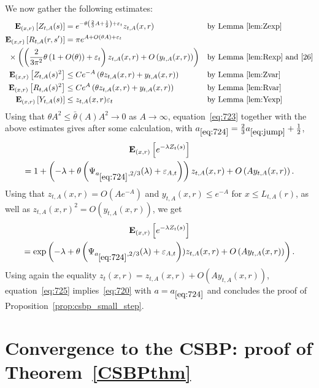 \documentclass[AHL,Unicode,longabstracts,published]{cedram}
\newcommand*\eps{\varepsilon}
\newcommand*\E{\mathbf{E}}
\newcommand{\1} {\mathds{1}}
\renewcommand*\to{\rightarrow}
\begin{document}
We now gather the following estimates:
\begin{align*}
\E_{(x,r)}\left[Z_{t,A}(s)\right] &= e^{-\theta\left(\frac{2}{3}A+\frac{1}{2}\right)+\eps_t} z_{t,A}(x,r) && \text{by Lemma~\ref{lem:Zexp}}\\
\E_{(x,r)}\left[R_{t,A}(r,s')\right] &= \pi e^{A+O(\theta A)+\eps_t}\\
&\hspace{-1in}\times \left(\left(\frac{2}{3\pi^2}\theta\left(1+ O(\theta)\right) + \eps_t \right) z_{t,A}(x,r) + O\left(y_{t,A}(x,r)\right)\right) && \text{by Lemma~\ref{lem:Rexp} and~\eqref{26}}\\
\E_{(x,r)}\left[Z_{t,A}(s)^2\right] &\le Ce^{-A}\left(\theta z_{t,A}(x,r)+y_{t,A}(x,r)\right) && \text{by Lemma~\ref{lem:Zvar}}\\
\E_{(x,r)}\left[R_{t,A}(s)^2\right] &\le Ce^A\left(\theta z_{t,A}(x,r)+y_{t,A}(x,r)\right) && \text{by Lemma~\ref{lem:Rvar}}\\
\E_{(x,r)}\left[Y_{t,A}(s)\right] &\le z_{t,A}(x,r)\eps_t && \text{by Lemma~\ref{lem:Yexp}}
\end{align*}
Using that $\theta A^2 \le \bar\theta(A)A^2 \to 0$ as $A\to\infty$, equation~\eqref{eq:723} together with the above estimates gives after some calculation, with $a_{\eqref{eq:724}} = \frac{2}{3}a_{\eqref{eq:jump}}+\frac{1}{2}$,
\begin{multline}\label{eq:724}
\E_{(x,r)}\left[e^{-\lambda Z_t(s)}\right] \\
= 1 + \left(-\lambda + \theta\left(\Psi_{a_{\eqref{eq:724}},2/3}(\lambda)+\eps_{A,t}\right)\right)z_{t,A}(x,r) + O\left(Ay_{t,A}(x,r)\right).
\end{multline}
Using that $z_{t,A}(x,r) =O(A e^{-A})$ and $y_{t,A}(x,r) \le e^{-A}$ for $x\le L_{t,A}(r)$, as well as $z_{t,A}(x,r)^2 = O(y_{t,A}(x,r))$, we get
\begin{multline}\label{eq:725}
\E_{(x,r)}\left[e^{-\lambda Z_t(s)}\right] \\
= \exp\left(-\lambda + \theta\left(\Psi_{a_{\eqref{eq:724}},2/3}(\lambda)+\eps_{A,t}\right))z_{t,A}(x,r) + O\left(Ay_{t,A}(x,r)\right)\right).
\end{multline}
Using again the equality $z_t(x,r) = z_{t,A}(x,r) + O(Ay_{t,A}(x,r))$, equation~\eqref{eq:725} implies~\eqref{eq:720} with $a = a_{\eqref{eq:724}}$ and concludes the proof of Proposition~\ref{prop:csbp_small_step}.

\section{Convergence to the CSBP: proof of Theorem~\ref{CSBPthm}}\label{sec:csbp_proof}
\end{document}
